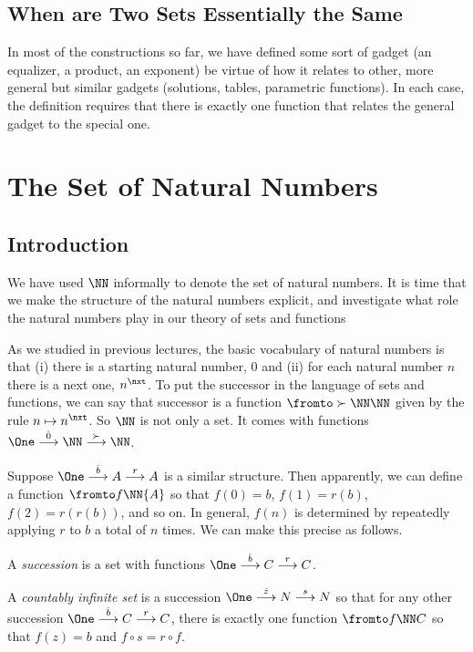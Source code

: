 \section{When are Two Sets Essentially the Same}

In most of the constructions so far, we have defined some sort of gadget (an equalizer, a product, an exponent) be virtue of how it relates to other, more general but similar gadgets (solutions, tables, parametric functions).
In each case, the definition requires that there is exactly one function that relates the general gadget 
to the special one.  

\chapter{The Set of Natural Numbers}

\begin{goals}
	
\end{goals}

\section{Introduction}

We have used $\NN$ informally to denote the set of natural numbers. It is time that we make the structure 
of the natural numbers explicit,  and investigate what role the natural numbers play in our theory of sets and functions

 As we studied in previous lectures, the basic vocabulary of natural numbers is that (i) there is a starting natural number, $0$ and (ii) for each natural number $n$
there is a next one, $n^\nxt$. To put the successor in the language of sets and functions, we can 
say that successor is a function $\fromto \succ\NN\NN$ given by the rule $n\mapsto n^\nxt$.
So $\NN$ is not only a set. It comes with functions $\One\stackrel{\hat{0}}{\longrightarrow}\NN\stackrel{\succ}{\longrightarrow}\NN$.

Suppose $\One\stackrel{\hat{b}}{\longrightarrow}A\stackrel{r}{\longrightarrow}A$ is a similar structure.
Then apparently, we can define a function $\fromto f\NN{A}$ so that $f(0)=b$, $f(1)=r(b)$, $f(2)=r(r(b))$,
and so on. In general, $f(n)$ is determined by repeatedly applying $r$ to $b$ a total of $n$ times.
We can make this precise as follows.

\begin{defn}
	A \emph{succession} is a set with functions $\One\stackrel{\hat{b}}{\longrightarrow}C\stackrel{r}{\longrightarrow}C$.
	
	A \emph{countably infinite set} is a succession $\One\stackrel{\hat{z}}{\longrightarrow}N\stackrel{s}{\longrightarrow}N$ so that for any other succession
	$\One\stackrel{\hat{b}}{\longrightarrow}C\stackrel{r}{\longrightarrow}C$, there is exactly one
	function $\fromto f\NN C$ so that $f(z)=b$ and $f\circ s = r\circ f$.
\end{defn}


